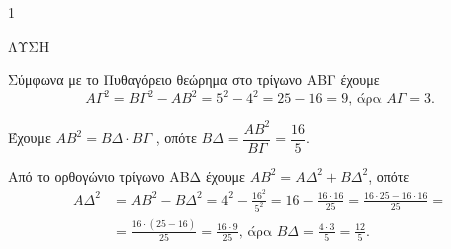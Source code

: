 \begin{ylh}{1}
	\item 
	ΛΥΣΗ
	\begin{alist}
		\item Σύμφωνα με το Πυθαγόρειο θεώρημα στο τρίγωνο ΑΒΓ έχουμε
		      \[ ΑΓ^2 = ΒΓ^2 - ΑΒ^2 = 5^2 - 4^2 = 25 - 16 = 9 \text{, άρα } ΑΓ = 3. \]
		
		\item Έχουμε $ΑΒ^2 = ΒΔ \cdot ΒΓ$ , οπότε $ΒΔ = \dfrac{ΑΒ^2}{ΒΓ} = \dfrac{16}{5}$.
		
		\item Από το ορθογώνιο τρίγωνο ΑΒΔ έχουμε $ΑΒ^2 = ΑΔ^2 + ΒΔ^2$, οπότε
		      \begin{align*}
			      ΑΔ^2 &= ΑΒ^2 - ΒΔ^2 = 4^2 - \frac{16^2}{5^2} = 16 - \frac{16 \cdot 16}{25} = \frac{16 \cdot 25 - 16 \cdot 16}{25} =                          \\
			           &= \frac{16 \cdot (25-16)}{25} = \frac{16 \cdot 9}{25} \text{, άρα } ΒΔ = \frac{4 \cdot 3}{5} = \frac{12}{5}.
		      \end{align*}
	\end{alist}
\end{ylh}